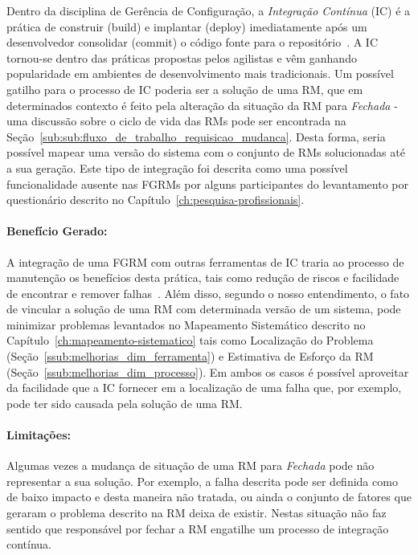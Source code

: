 Dentro da disciplina de Gerência de Configuração, a \textit{Integração
    Contínua} (IC) é a prática de construir (build) e implantar (deploy)
imediatamente após um desenvolvedor consolidar (commit) o código fonte para o
repositório~\cite{aiello2010configuration}. A IC tornou-se dentro das práticas
propostas pelos agilistas e vêm ganhando popularidade em ambientes de
desenvolvimento mais tradicionais. Um possível gatilho para o processo de IC
poderia ser a solução de uma RM, que em determinados contexto é feito pela
alteração da situação da RM para \textit{Fechada} \@-\@ uma discussão sobre o
ciclo de vida das RMs pode ser encontrada na
Seção~\ref{sub:sub:fluxo_de_trabalho_requisicao_mudanca}. Desta forma, seria
possível mapear uma versão do sistema com o conjunto de RMs solucionadas até a
sua geração. Este tipo de integração foi descrita como uma possível
funcionalidade ausente nas FGRMs por alguns participantes do levantamento por
questionário descrito no Capítulo~\ref{ch:pesquisa-profissionais}.

\paragraph{Benefício Gerado:}
\label{par:papéis_afetados_s05}

A integração de uma FGRM com outras ferramentas de IC traria ao processo de
manutenção os benefícios desta prática, tais como redução de riscos e facilidade
de encontrar e remover falhas~\cite{fowler2006continuous}.  Além disso, segundo
o nosso entendimento, o fato de vincular a solução de uma RM com determinada
versão de um sistema, pode minimizar problemas levantados no Mapeamento
Sistemático descrito no Capítulo~\ref{ch:mapeamento-sistematico} tais como
Localização do Problema (Seção~\ref{ssub:melhorias_dim_ferramenta}) e Estimativa
de Esforço da RM (Seção~\ref{ssub:melhorias_dim_processo}). Em ambos os casos é
possível aproveitar da facilidade que a IC fornecer em a localização de uma
falha que, por exemplo, pode ter sido causada pela solução de uma RM\@.

\paragraph{Limitações:}
\label{par:limitacoes_s05}

Algumas vezes a mudança de situação de uma RM para \textit{Fechada} pode não
representar a sua solução. Por exemplo, a falha descrita pode ser definida como
de baixo impacto e desta maneira não tratada, ou ainda o conjunto de fatores que
geraram o problema descrito na RM deixa de existir. Nestas situação não faz
sentido que responsável por fechar a RM engatilhe um processo de integração
contínua.

